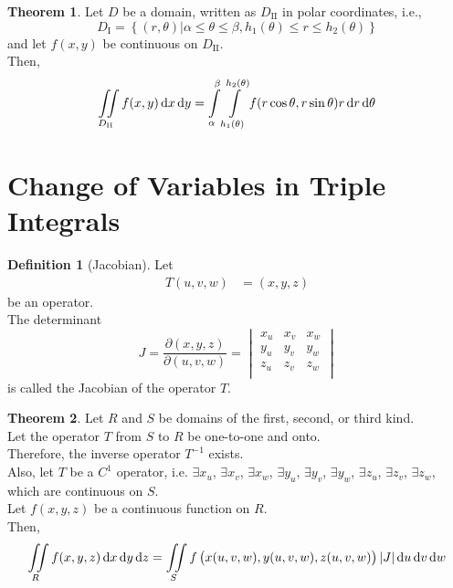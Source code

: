 \documentclass[fleqn, a4paper, 8pt, twoside]{amsart}
\theoremstyle{definition}
\theoremstyle{bluedefinition}
\newtheorem{definition}{Definition}
\theoremstyle{redtheorem}
\newtheorem{theorem}{Theorem}
\begin{document}
\begin{multicols}{2}
\begin{spacing}{0.7}
\begin{theorem}
	Let $D$ be a domain, written as $D_{\mathrm{II}}$ in polar coordinates, i.e.,
	\begin{equation*}
		D_{\mathrm{I}} = \left\{ (r,\theta) | \alpha \le \theta \le \beta , h_1(\theta) \le r \le h_2(\theta) \right\}
	\end{equation*}
	and let $f(x,y)$ be continuous on $D_{\mathrm{II}}$.\\
	Then,
	\begin{equation*}
		\iint\limits_{D_{\mathrm{II}}} f(x,y) \dif x \dif y = \int\limits_{\alpha}^{\beta} \int\limits_{h_1(\theta)}^{h_2(\theta)} f(r \cos \theta, r \sin \theta) r \dif r\dif \theta
	\end{equation*}
\end{theorem}

\section{Change of Variables in Triple Integrals}

\begin{definition}[Jacobian]
	Let
	\begin{align*}
		T(u,v,w) & = (x,y,z)
	\end{align*}
	be an operator.\\
	The determinant
	\begin{equation*}
		J = \frac{\partial(x,y,z)}{\partial(u,v,w)} =
			\begin{vmatrix}
				x_u & x_v & x_w \\
				y_u & y_v & y_w \\
				z_u & z_v & z_w \\
			\end{vmatrix}
	\end{equation*}
	is called the Jacobian of the operator $T$.
\end{definition}

\begin{theorem}
	Let $R$ and $S$ be domains of the first, second, or third kind.\\
	Let the operator $T$ from $S$ to $R$ be one-to-one and onto.\\
	Therefore, the inverse operator $T^{-1}$ exists.\\
	Also, let $T$ be a $C^1$ operator, i.e. $\exists x_u$, $\exists x_v$, $\exists x_w$, $\exists y_u$, $\exists y_v$, $\exists y_w$, $\exists z_u$, $\exists z_v$, $\exists z_w$, which are continuous on $S$.\\
	Let $f(x,y,z)$ be a continuous function on $R$.\\
	Then,
	\begin{equation*}
		\iint\limits_{R} f(x,y,z) \dif x \dif y \dif z = \iint\limits_{S} f\left( x(u,v,w), y(u,v,w), z(u,v,w) \right) |J| \dif u \dif v \dif w
	\end{equation*}
\end{theorem}


\end{spacing}
\end{multicols}
\end{document}

